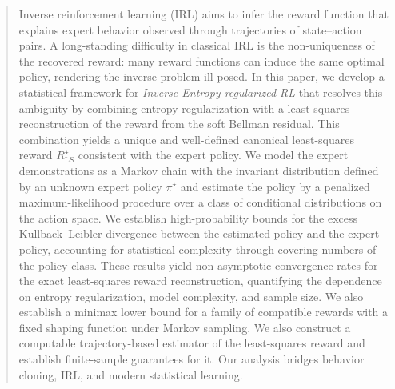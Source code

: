 \documentclass{article}
\theoremstyle{definition}
\theoremstyle{remark}
\theoremstyle{plain}
\numberwithin{equation}{section}
\begin{document}

    



\begin{abstract}
 Inverse reinforcement learning (IRL) aims to infer the reward function that explains 
expert behavior observed through trajectories of state--action pairs. A long-standing 
difficulty in classical IRL is the non-uniqueness of the recovered reward: many reward 
functions can induce the same optimal policy, rendering the inverse problem ill-posed. 
In this paper, we develop a statistical framework for \emph{Inverse Entropy-regularized 
RL}  that resolves this ambiguity by combining entropy 
regularization with a least-squares reconstruction of the reward from the soft Bellman 
residual. This combination yields a unique and well-defined  canonical least-squares reward  \(R^\star_{\operatorname{LS}}\) consistent with the 
expert policy.
We model the expert demonstrations as a Markov chain with the invariant distribution defined by an
unknown expert policy \(\pi^\star\)
and estimate the policy by a penalized maximum-likelihood procedure over
a class of conditional distributions on the action space. We establish high-probability bounds for the
excess Kullback–Leibler divergence between the estimated policy and the expert policy, accounting for
statistical complexity through covering numbers of the policy class. These results yield non-asymptotic convergence rates for the exact
least-squares reward reconstruction, quantifying the dependence on
entropy regularization, model complexity, and sample size. We also
establish a minimax lower bound for a family of compatible rewards
with a fixed shaping function under Markov sampling. We also construct a computable trajectory-based estimator of the least-squares reward and establish finite-sample guarantees for it. Our analysis bridges behavior cloning, IRL, and modern statistical learning.
\end{abstract}
\end{document}
